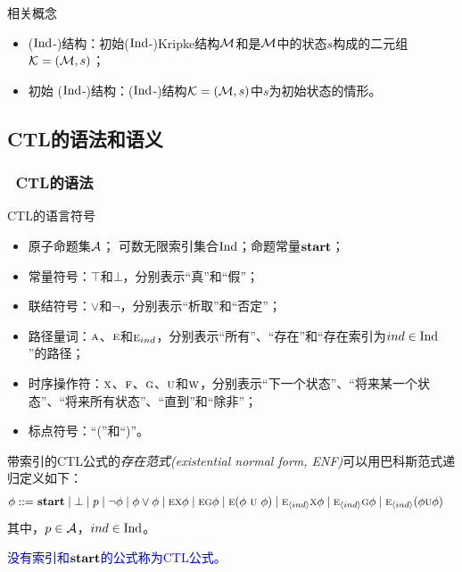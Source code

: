 \documentclass[aspectratio=1610, 9pt, CJK]{beamer}
\begin{document}
\begin{frame}
{		%
		\begin{block}{相关概念}
			\begin{itemize}
				\item \textcolor{blue!80}{($\textrm{Ind}$-)结构}：初始($\textrm{Ind}$-)Kripke结构${\cal M}$和是${\cal M}$中的状态$s$构成的二元组${\cal K}=({\cal M}, s)$；
				\item \textcolor{blue!80}{初始 ($\textrm{Ind}$-)结构}：($\textrm{Ind}$-)结构${\cal K}=({\cal M}, s)$中$s$为初始状态的情形。
			\end{itemize} 
			
		\end{block}
	}
\end{frame}


\subsection{CTL的语法和语义}
\begin{frame} 
	\frametitle{~CTL的语法}
	{\footnotesize 
		\begin{block}{CTL的语言符号}
			\begin{itemize}
				\item 原子命题集${\cal A}$； \quad 可数无限索引集合$\textrm{Ind}$；\quad 命题常量$\textbf{start}$；
				\item 常量符号：$\top$和$\bot$，分别表示“真”和“假”；
				\item 联结符号：$\vee$和$\neg$，分别表示“析取”和“否定”；
				\item 路径量词：$\textsc{a}$、$\textsc{e}$和$\textsc{e}_{ind}$，分别表示“所有”、“存在”和“存在索引为$ind\in \textrm{Ind}$”的路径；
				\item 时序操作符：$\textsc{x}$、$\textsc{f}$、$\textsc{g}$、$\textsc{u}$和$\textsc{w}$，分别表示“下一个状态”、“将来某一个状态”、“将来所有状态”、“直到”和“除非”；
				\item 标点符号：“(”和“)”。
			\end{itemize}
		\end{block}
		\begin{definition}[带索引的CTL]
			带索引的CTL公式的\emph{存在范式(existential normal form, ENF)}可以用巴科斯范式递归定义如下：
			\begin{align*}
				\phi  ::= & \ \start\mid \bot %
				\mid p \mid\neg\phi \mid \phi\lor\phi \mid
				\EXIST \NEXT \phi \mid
				\EXIST \GLOBAL \phi \mid 
				\EXIST (\phi\ \UNTILL\ \phi)\mid 
				\EXIST_{\tuple{ind}}\NEXT \phi  \mid 
				\EXIST_{\tuple{ind}}\GLOBAL \phi \mid
				\EXIST_{\tuple{ind}}(\phi \UNTILL \phi)  
			\end{align*}
			其中，$p\in {\cal A}$，$ind \in \textrm{Ind}$。
			
			\textcolor{blue}{没有索引和$\textbf{start}$的公式称为CTL公式。}
		\end{definition} 
	}
\end{frame}
\end{document}
